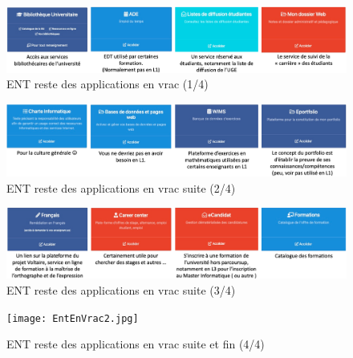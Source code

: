 \documentclass{article}
\begin{document}
\begin{exercice}


\begin{figure}[h!]
    \begin{center}
    \includegraphics[scale=0.25]{EntEnVrac12.png}
    \caption{ENT reste des applications en vrac (1/4)}
     \end{center}
\end{figure}    

\begin{figure}[h!]
    \begin{center}
    \includegraphics[scale=0.25]{EntEnVrac21.png}
    \caption{ENT reste des applications en vrac suite (2/4)}
     \end{center}
\end{figure}    

\begin{figure}[h!]
    \begin{center}
    \includegraphics[scale=0.25]{EntEnVrac31.png}
    \caption{ENT reste des applications en vrac suite (3/4)}
     \end{center}
\end{figure}    

\begin{figure}[h!]
    \begin{center}
    \texttt{[image: EntEnVrac2.jpg]}
    \caption{ENT reste des applications en vrac suite et fin (4/4)}
     \end{center}
\end{figure}    

\end{exercice}
\end{document}
